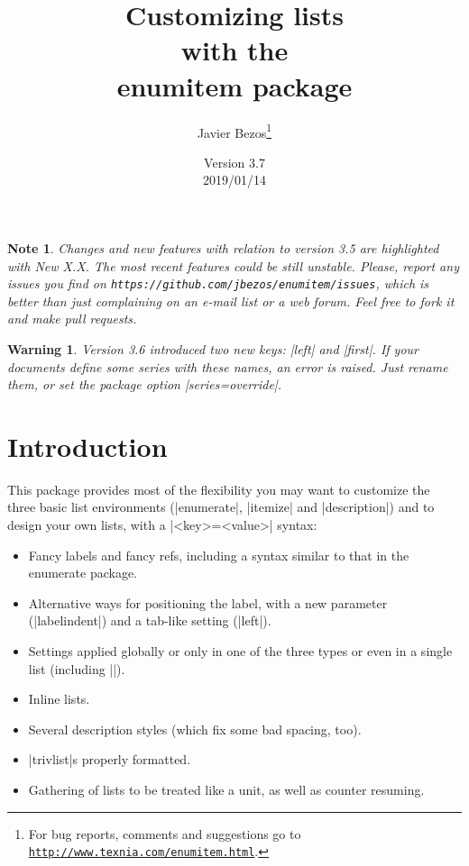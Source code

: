 \documentclass[a4paper]{ltxguide}
\title{Customizing lists\\with the\\\textsf{enumitem} package}
\author{Javier Bezos\footnote{For bug reports, comments and
suggestions go to \href{http://www.texnia.com/enumitem.html}%
{\texttt{http://www.texnia.com/enumitem.html}}.}}
\date{Version 3.7\\2019/01/14}
\newtheorem{warning}{Warning}
\newtheorem{note}{Note}
\newcommand\New[1]{%
  \colorbox[rgb]{.87, .9, .83}{New #1}\enspace\ignorespaces}
\begin{document}
\maketitle
\tableofcontents

\newpage

\vspace*{1cm}

\begin{note}
  Changes and new features with relation to version 3.5 are highlighted
  with \New{X.X}\hspace{-.5em}. The most recent features could be still
  unstable. Please, report any issues you find on
  \texttt{https://github.com/jbezos/enumitem/issues}, which is better
  than just complaining on an e-mail list or a web forum. Feel free to
  fork it and make pull requests.
\end{note}

\begin{warning}
  Version 3.6 introduced two new keys: |left| and |first|. If your
  documents define some series with these names, an error is raised.
  Just rename them, or set the package option |series=override|.
\end{warning}

\section{Introduction}

This package provides most of the flexibility you may want to customize
the three basic list environments (|enumerate|, |itemize| and
|description|) and to design your own lists, with a |<key>=<value>|
syntax:
\begin{itemize}
\item Fancy labels and fancy refs, including a syntax similar to that
in the \textsf{enumerate} package.

\item Alternative ways for positioning the label, with a new 
  parameter (|labelindent|) and a tab-like setting (|left|).

\item Settings applied globally or only in one of the three types or
even in a single list (including |\topsep|).

\item Inline lists.

\item Several description styles (which fix some bad spacing, too).

\item |trivlist|s properly formatted.

\item Gathering of lists to be treated like a unit, as well as counter 
resuming.

\end{itemize}
\end{document}

